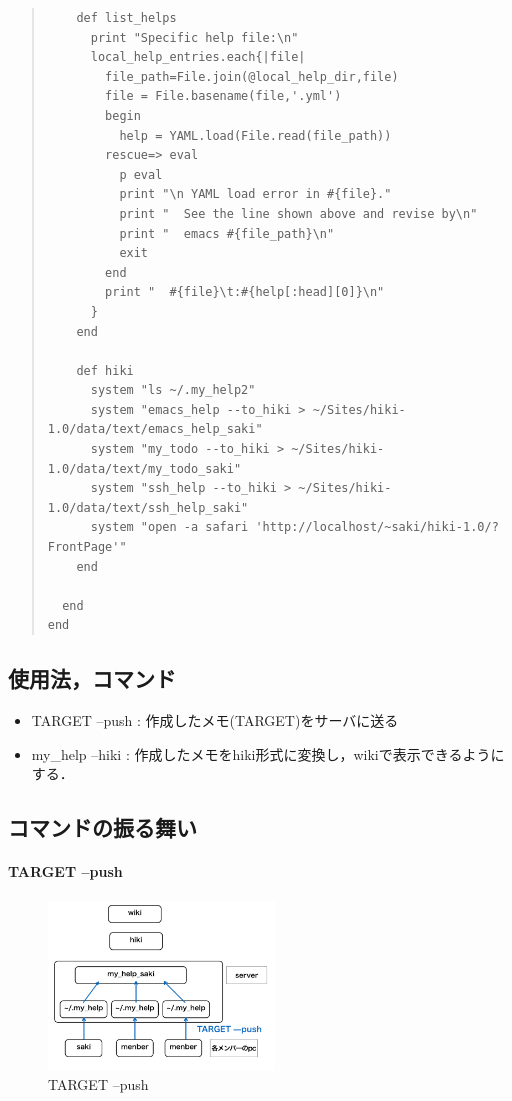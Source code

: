 \begin{quote}
\begin{verbatim}
    def list_helps
      print "Specific help file:\n"
      local_help_entries.each{|file|
        file_path=File.join(@local_help_dir,file)
        file = File.basename(file,'.yml')
        begin
          help = YAML.load(File.read(file_path))
        rescue=> eval
          p eval
          print "\n YAML load error in #{file}."
          print "  See the line shown above and revise by\n"
          print "  emacs #{file_path}\n"
          exit
        end
        print "  #{file}\t:#{help[:head][0]}\n"
      }
    end

    def hiki
      system "ls ~/.my_help2"
      system "emacs_help --to_hiki > ~/Sites/hiki-1.0/data/text/emacs_help_saki"
      system "my_todo --to_hiki > ~/Sites/hiki-1.0/data/text/my_todo_saki"
      system "ssh_help --to_hiki > ~/Sites/hiki-1.0/data/text/ssh_help_saki"
      system "open -a safari 'http://localhost/~saki/hiki-1.0/?FrontPage'"
    end

  end
end
\end{verbatim}\end{quote}


\subsection{使用法，コマンド}
\begin{itemize}
\item TARGET --push : 作成したメモ(TARGET)をサーバに送る
\end{itemize}  
\begin{itemize}
\item my\_help --hiki : 作成したメモをhiki形式に変換し，wikiで表示できるようにする．
\end{itemize}

\subsection{コマンドの振る舞い}
\paragraph{TARGET --push}

\begin{figure}[htbp]\begin{center}
\includegraphics[width=6cm,bb=100 100 600 700]{my_help2hiki_saki.012.png}
\caption{TARGET --push}
\label{default}\end{center}\end{figure}

